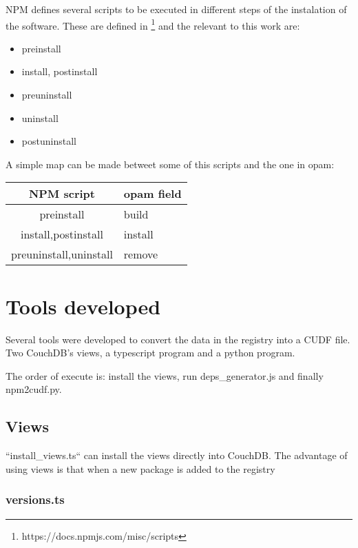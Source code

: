 \documentclass[letterpaper,12pt]{report}
\begin{document}
NPM defines several scripts to be executed in different steps of the instalation
of the software. These are defined in
\footnote{https://docs.npmjs.com/misc/scripts} and the relevant to this work
are:

\begin{itemize}
    \item preinstall
    \item install, postinstall
    \item preuninstall
    \item uninstall
    \item postuninstall
\end{itemize}

A simple map can be made betweet some of this scripts and the one in opam:



\begin{tabularx}{\textwidth}{|c|X|}
        \hline
        NPM script              & opam field    \\ \hline \hline
        preinstall              & build         \\ \hline
        install,postinstall     & install       \\ \hline
        preuninstall,uninstall  & remove        \\ \hline
        \hline
\end{tabularx}



\section{Tools developed}

Several tools were developed to convert the data in the registry into a CUDF
file. Two CouchDB's views, a typescript program and a python program.

The order of execute is: install the views, run deps\_generator.js and finally
npm2cudf.py.

\subsection{Views}

``install\_views.ts`` can install the views directly into CouchDB. The advantage
of using views is that when a new package is added to the registry 

\subsubsection{versions.ts}
\end{document}
